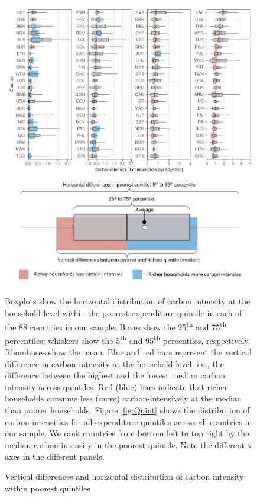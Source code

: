 \documentclass[12pt, a4paper]{article}
\newenvironment{subcaption2}
{\strut
\vspace{-5pt}
\begin{minipage}[b]{0.95\textwidth}
  \hspace*{-\parindent}
  \footnotesize}
 {\end{minipage}}
\begin{document}
\begin{figure}[ht!]
    \centering
    \includegraphics{1_Figures/Figure 1/Figure_1_2017_11B.pdf}
    \includegraphics[scale=0.7]{1_Figures/Figure 1/Legend Figure 1.pdf}
    \caption{Vertical differences and horizontal distribution of carbon intensity within poorest quintiles}
    \label{fig:fig_1}
    \begin{subcaption2}
    Boxplots show the horizontal distribution of carbon intensity at the household level within the poorest expenditure quintile in each of the 88 countries in our sample: Boxes show the 25\textsuperscript{th} and 75\textsuperscript{th} percentiles; whiskers show the 5\textsuperscript{th} and 95\textsuperscript{th} percentiles, respectively. Rhombuses show the mean. Blue and red bars represent the vertical difference in carbon intensity at the household level, i.e., the difference between the highest and the lowest median carbon intensity across quintiles. Red (blue) bars indicate that richer households consume less (more) carbon-intensively at the median than poorer households. Figure \ref{fig:Quint} shows the distribution of carbon intensities for all expenditure quintiles across all countries in our sample. We rank countries from bottom left to top right by the median carbon intensity in the poorest quintile. Note the different x-axes in the different panels.
    \end{subcaption2}
\end{figure}
\end{document}

